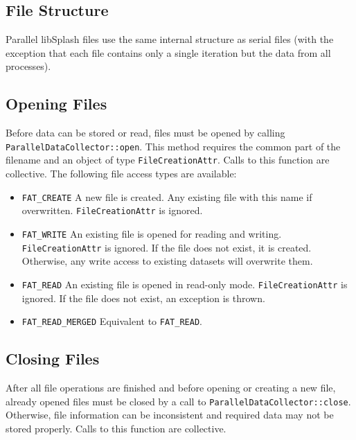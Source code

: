 \documentclass[a4paper,10pt,BCOR12mm]{report}
\newcommand{\code}[1]{\small \texttt{#1}}
\begin{document}
\subsection{File Structure}

Parallel libSplash files use the same internal structure as serial files (with the exception
that each file contains only a single iteration but the data from all processes).


\subsection{Opening Files}

Before data can be stored or read, files must be opened by calling \\
\code{ParallelDataCollector::open}. This method requires the common part of the filename
and an object of type \code{FileCreationAttr}.
Calls to this function are collective.
The following file access types are available:
\begin{itemize}
	\item \code{FAT\_CREATE}
	A new file is created. Any existing file with this name if overwritten.
	\code{FileCreationAttr} is ignored.

	\item \code{FAT\_WRITE}
	An existing file is opened for reading and writing.
	\code{FileCreationAttr} is ignored.
	If the file does not exist, it is created.
	Otherwise, any write access to existing datasets will overwrite them.

	\item \code{FAT\_READ}
	An existing file is opened in read-only mode.
	\code{FileCreationAttr} is ignored.
	If the file does not exist, an exception is thrown.

	\item \code{FAT\_READ\_MERGED}
	Equivalent to \code{FAT\_READ}.
\end{itemize}


\subsection{Closing Files}

After all file operations are finished and before opening or creating a new file,
already opened files must be closed by a call to \code{ParallelDataCollector::close}.
Otherwise, file information can be inconsistent and required data may not
be stored properly.
Calls to this function are collective.
\end{document}
